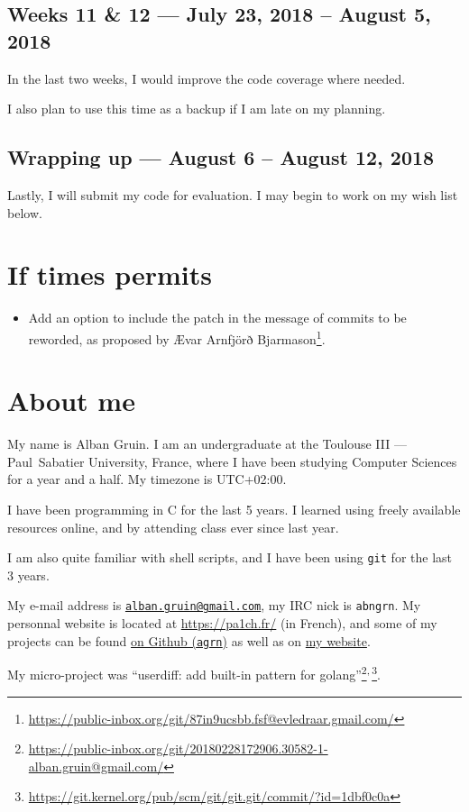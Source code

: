 \documentclass[11pt]{article}
\begin{document}
\subsection{Weeks 11 \& 12 --- July 23, 2018 -- August 5, 2018}
\label{sec:orgea19964}
In the last two weeks, I would improve the code coverage where needed.

I also plan to use this time as a backup if I am late on my planning.

\subsection{Wrapping up --- August 6 -- August 12, 2018}
\label{sec:orge0ccbfe}
Lastly, I will submit my code for evaluation. I may begin to work on
my wish list below.

\section{If times permits}
\label{sec:orgd27a8d4}
\begin{itemize}
\item Add an option to include the patch in the message of commits to be
reworded, as proposed by Ævar Arnfjörð Bjarmason\footnote{\url{https://public-inbox.org/git/87in9ucsbb.fsf@evledraar.gmail.com/}}.
\end{itemize}

\section{About me}
\label{sec:orgdc73a7e}
My name is Alban Gruin. I am an undergraduate at the Toulouse III —
Paul Sabatier University, France, where I have been studying Computer
Sciences for a year and a half. My timezone is UTC+02:00.

I have been programming in C for the last 5 years. I learned using
freely available resources online, and by attending class ever since
last year.

I am also quite familiar with shell scripts, and I have been using
\texttt{git} for the last 3 years.

My e-mail address is \href{mailto:alban.gruin@gmail.com}{\texttt{alban.gruin@gmail.com}}, my IRC nick is
\texttt{abngrn}. My personnal website is located at \url{https://pa1ch.fr/} (in
French), and some of my projects can be found \href{https://github.com/agrn}{on Github (\texttt{agrn})} as
well as on \href{https://git.pa1ch.fr/alban}{my website}.

My micro-project was “userdiff: add built-in pattern for
golang”\footnote{\url{https://public-inbox.org/git/20180228172906.30582-1-alban.gruin@gmail.com/}}\textsuperscript{,}\,\footnote{\url{https://git.kernel.org/pub/scm/git/git.git/commit/?id=1dbf0c0a}}.
\end{document}
